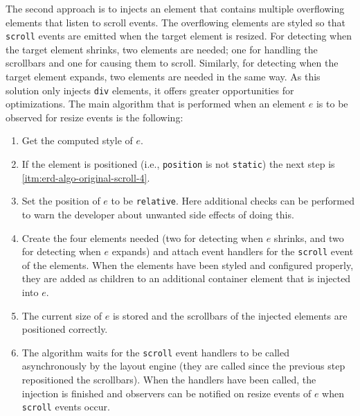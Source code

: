 \documentclass{acm_proc_article-sp}
\newcommand{\code}[1]{\texttt{#1}}
\newcommand{\gls}[1]{#1}
\begin{document}
    The second approach is to injects an \gls{element} that contains multiple overflowing elements that listen to scroll events.
    The overflowing elements are styled so that \code{scroll} events are emitted when the target \gls{element} is resized.
    For detecting when the target \gls{element} shrinks, two elements are needed; one for handling the scrollbars and one for causing them to scroll.
    Similarly, for detecting when the target \gls{element} expands, two elements are needed in the same way.
    As this solution only injects \code{div} elements, it offers greater opportunities for optimizations.
    The main algorithm that is performed when an element $e$ is to be observed for resize events is the following:
    \begin{enumerate}
      \item\label{itm:erd-algo-original-scroll-1} Get the computed style of $e$.
      \item\label{itm:erd-algo-original-scroll-2} If the element is positioned (i.e., \code{position} is not \code{static}) the next step is \ref{itm:erd-algo-original-scroll-4}.
      \item\label{itm:erd-algo-original-scroll-3} Set the position of $e$ to be \code{relative}. Here additional checks can be performed to warn the developer about unwanted side effects of doing this.
      \item\label{itm:erd-algo-original-scroll-4} Create the four elements needed (two for detecting when $e$ shrinks, and two for detecting when $e$ expands) and attach event handlers for the \code{scroll} event of the elements.
                                                  When the elements have been styled and configured properly, they are added as children to an additional container element that is injected into $e$.
      \item\label{itm:erd-algo-original-scroll-5} The current size of $e$ is stored and the scrollbars of the injected elements are positioned correctly.
      \item\label{itm:erd-algo-original-scroll-6} The algorithm waits for the \code{scroll} event handlers to be called asynchronously by the \gls{layout engine} (they are called since the previous step repositioned the scrollbars).
                                                  When the handlers have been called, the injection is finished and observers can be notified on resize events of $e$ when \code{scroll} events occur.
    \end{enumerate}
\end{document}
